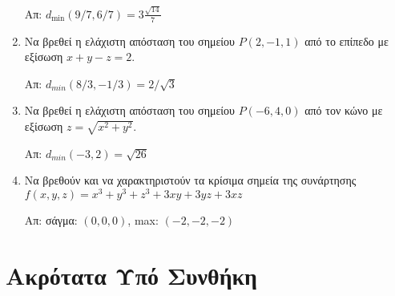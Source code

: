 \begin{enumerate}
    \hfill Απ: $ d_{\min}(9/7,6/7) = 3\frac{\sqrt{14}}{7} $  

  \item Να βρεθεί η ελάχιστη απόσταση του σημείου $ P(2,-1,1) $ από το επίπεδο με 
    εξίσωση $ x+y-z=2 $. 
    
    \hfill Απ: $ d_{min}(8/3,-1/3) = 2 /\sqrt{3} $ 

  \item Να βρεθεί η ελάχιστη απόσταση του σημείου $ P(-6,4,0) $ από τον κώνο με 
    εξίσωση $ z = \sqrt{x^{2}+y^{2}} $. 
    
    \hfill Απ: $ d_{min}(-3,2) = \sqrt{26} $ 

  \item Να βρεθούν και να χαρακτηριστούν τα κρίσιμα σημεία της συνάρτησης 
    $ f(x,y,z) = x^{3} + y^{3}+z^{3} + 3xy +3yz + 3xz $

    \hfill Απ: σάγμα: $(0,0,0)$, max: $(-2,-2,-2)$  

\end{enumerate}


\section*{Ακρότατα Υπό Συνθήκη}

